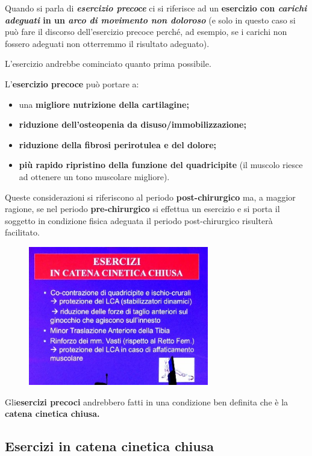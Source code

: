 Quando si parla di \emph{\textbf{esercizio precoce}} ci si riferisce ad
un \textbf{esercizio con \emph{carichi adeguati} in un \emph{arco di
movimento non doloroso }}(e solo in questo caso si può fare il discorso
dell'esercizio precoce perché, ad esempio, se i carichi non fossero
adeguati non otterremmo il risultato adeguato).

L'esercizio andrebbe cominciato quanto prima possibile.

L'\textbf{esercizio precoce} può portare a:

\begin{itemize}
\item
  una \textbf{migliore nutrizione della cartilagine;}
\item
  \textbf{riduzione dell'osteopenia da disuso/immobilizzazione;}
\item
  \textbf{riduzione della fibrosi perirotulea e del dolore;}
\item
  \textbf{più rapido ripristino della funzione del quadricipite} (il
  muscolo riesce ad ottenere un tono muscolare migliore).
\end{itemize}

Queste considerazioni si riferiscono al periodo \textbf{post-chirurgico}
ma, a maggior ragione, se nel periodo \textbf{pre-chirurgico} si
effettua un esercizio e si porta il soggetto in condizione fisica
adeguata il periodo post-chirurgico risulterà facilitato.

\begin{figure}[!ht]
\centering
	\includegraphics[width=0.7\textwidth]{030/image4.jpeg}
\end{figure}

Gli\textbf{esercizi precoci} andrebbero fatti in una condizione ben
definita che è la \textbf{catena cinetica chiusa.}

\subsection{Esercizi in catena cinetica chiusa}


